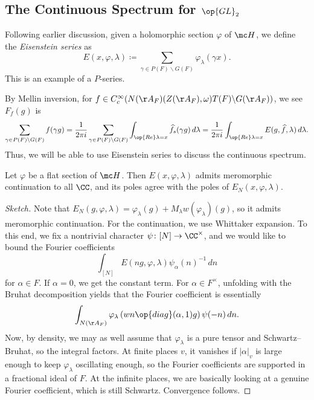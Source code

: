 \documentclass{article}
\begin{document}
\subsection{The Continuous Spectrum for \texorpdfstring{$\op{GL}_2$}{GL(2)}}
\begin{notation}
	Following earlier discussion, given a holomorphic section $\varphi$ of $\mc H$, we define the \textit{Eisenstein series} as
	\[E(x,\varphi,\lambda)\coloneqq\sum_{\gamma\in P(F)\backslash G(F)}\varphi_\lambda(\gamma x).\]
	This is an example of a $P$-series.
\end{notation}
\begin{remark}
	By Mellin inversion, for $f\in C_c^\infty(N(\AA_F)(Z(\AA_F),\omega)T(F)\backslash G(\AA_F))$, we see $F_f(g)$ is
	\[\sum_{\gamma\in P(F)\backslash G(F)}f(\gamma g)=\frac1{2\pi i}\sum_{\gamma\in P(F)\backslash G(F)}\int_{\op{Re}\lambda=x}\widehat f_s(\gamma g)\,d\lambda=\frac1{2\pi i}\int_{\op{Re}\lambda=x}E(g,\widehat f,\lambda)\,d\lambda.\]
	Thus, we will be able to use Eisenstein series to discuss the continuous spectrum.
\end{remark}
\begin{theorem}
	Let $\varphi$ be a flat section of $\mc H$. Then $E(x,\varphi,\lambda)$ admits meromorphic continuation to all $\CC$, and its poles agree with the poles of $E_N(x,\varphi,\lambda)$.
\end{theorem}
\begin{proof}[Sketch]
	Note that $E_N(g,\varphi,\lambda)=\varphi_\lambda(g)+M_\lambda w(\varphi_\lambda)(g)$, so it admits meromorphic continuation. For the continuation, we use Whittaker expansion. To this end, we fix a nontrivial character $\psi\colon[N]\to\CC^\times$, and we would like to bound the Fourier coefficients
	\[\int_{[N]}E(ng,\varphi,\lambda)\psi_\alpha(n)^{-1}\,dn\]
	for $\alpha\in F$. If $\alpha=0$, we get the constant term. For $\alpha\in F^\times$, unfolding with the Bruhat decomposition yields that the Fourier coefficient is essentially
	\[\int_{N(\AA_F)}\varphi_\lambda\left(wn\op{diag}(\alpha,1)g\right)\psi(-n)\,dn.\]
	Now, by density, we may as well assume that $\varphi_\lambda$ is a pure tensor and Schwartz--Bruhat, so the integral factors. At finite places $v$, it vanishes if $\left|\alpha\right|_v$ is large enough to keep $\varphi_\lambda$ oscillating enough, so the Fourier coefficients are supported in a fractional ideal of $F$. At the infinite places, we are basically looking at a genuine Fourier coefficient, which is still Schwartz. Convergence follows.
\end{proof}
\end{document}
